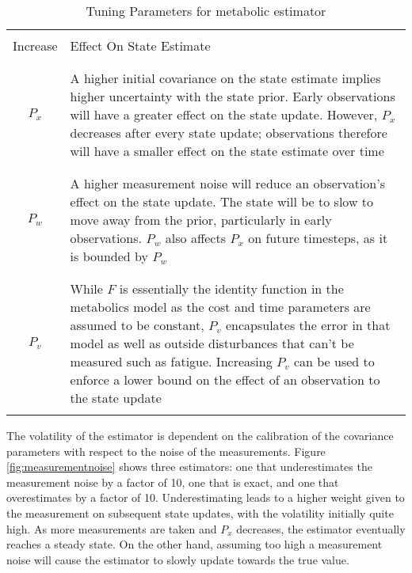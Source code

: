 \begin{table}[h]
  \centering
  \begin{tabular}{ | c | M{10cm} |}
  \hline
  &\\
  Increase & Effect On State Estimate \\ 
  &\\
  \hline
  &\\
  $P_x$ & A higher initial covariance on the state estimate implies higher uncertainty with the state prior. Early observations will have a greater effect on the state update. However, $P_x$ decreases after every state update; observations therefore will have a smaller effect on the state estimate over time\\ 
  &\\
  \hline
  &\\
  $P_w$ & A higher measurement noise will reduce an observation's effect on the state update. The state will be to slow to move away from the prior, particularly in early observations. $P_w$ also affects $P_x$ on future timesteps, as it is bounded by $P_w$\\ 
  &\\
  \hline
  &\\
  $P_v$ & While $F$ is essentially the identity function in the metabolics model as the cost and time parameters are assumed to be constant, $P_v$ encapsulates the error in that model as well as outside disturbances that can't be measured such as fatigue. Increasing $P_v$ can be used to enforce a lower bound on the effect of an observation to the state update\\ 
  &\\
  \hline

  \end{tabular}
  \caption{Tuning Parameters for metabolic estimator}
  \label{tab:esttuningparams}
\end{table}

The volatility of the estimator is dependent on the calibration of the covariance parameters with respect to the noise of the measurements. Figure \ref{fig:measurementnoise} shows three estimators: one that underestimates the measurement noise by a factor of 10, one that is exact, and one that overestimates by a factor of 10. Underestimating leads to a higher weight given to the measurement on subsequent state updates, with the volatility initially quite high. As more measurements are taken and $P_x$ decreases, the estimator eventually reaches a steady state. On the other hand, assuming too high a measurement noise will cause the estimator to slowly update towards the true value.

